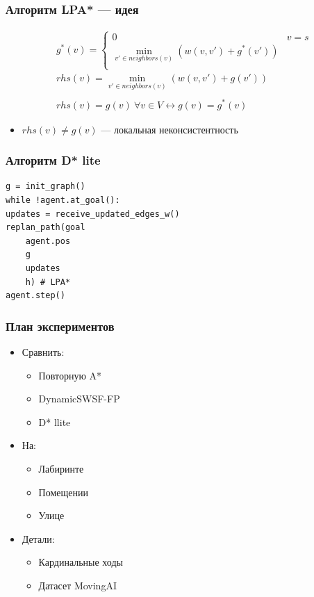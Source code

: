 \documentclass{beamer}
\begin{document}
    \begin{frame}
        \frametitle{Алгоритм LPA* --- идея}

        \begin{align*}
            &g^*(v) = \begin{cases}
                          0 &  v = s\\
                          \displaystyle \min_{v' \in neighbors(v)} (w(v, v') + g^*(v')) \\
            \end{cases} \\
            &rhs(v) = \min_{v' \in neighbors(v)} (w(v, v') + g(v')) \\ \\
            &rhs(v) = g(v)\ \forall v \in V \leftrightarrow g(v) = g^*(v)
        \end{align*}
        \begin{itemize}
            \item $rhs(v) \neq g(v)$ --- локальная неконсистентность
        \end{itemize}



    \end{frame}
    \begin{frame}[fragile]
        \frametitle{Алгоритм D* lite}
        \begin{verbatim}
g = init_graph()
while !agent.at_goal():
updates = receive_updated_edges_w()
replan_path(goal
    agent.pos
    g
    updates
    h) # LPA*
agent.step()
        \end{verbatim}

    \end{frame}

    \begin{frame}
        \frametitle{План экспериментов}
        \begin{itemize}
            \item Сравнить:
            \begin{itemize}
                \item Повторную A*
                \item DynamicSWSF-FP
                \item D* llite
            \end{itemize}
            \item На:
            \begin{itemize}
                \item Лабиринте
                \item Помещении
                \item Улице
            \end{itemize}
            \item Детали:
            \begin{itemize}
                \item Кардинальные ходы
                \item Датасет MovingAI
            \end{itemize}
        \end{itemize}
    \end{frame}
\end{document}
